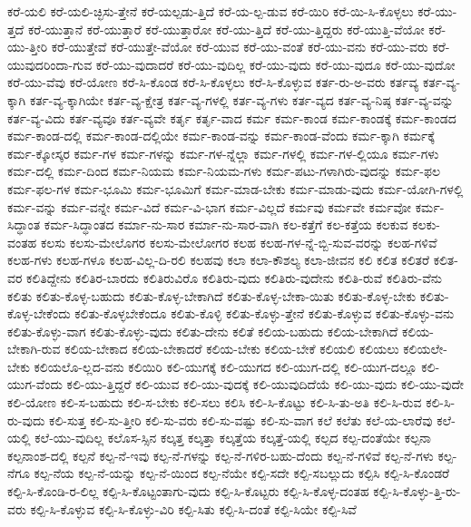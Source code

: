 {ಕರೆ-ಯಲಿ
ಕರೆ-ಯಲಿ-ಚ್ಛಿಸು-ತ್ತೇನೆ
ಕರೆ-ಯಲ್ಪಡು-ತ್ತಿದೆ
ಕರೆ-ಯ-ಲ್ಪ-ಡುವ
ಕರೆ-ಯಿರಿ
ಕರೆ-ಯಿ-ಸಿ-ಕೊಳ್ಳಲು
ಕರೆ-ಯು-ತ್ತದೆ
ಕರೆ-ಯುತ್ತಾನೆ
ಕರೆ-ಯುತ್ತಾರೆ
ಕರೆ-ಯುತ್ತಾರೋ
ಕರೆ-ಯು-ತ್ತಿದೆ
ಕರೆ-ಯು-ತ್ತಿದ್ದರು
ಕರೆ-ಯುತ್ತಿ-ವೆಯೋ
ಕರೆ-ಯು-ತ್ತೀರಿ
ಕರೆ-ಯುತ್ತೇವೆ
ಕರೆ-ಯುತ್ತೇ-ವೆಯೋ
ಕರೆ-ಯುವ
ಕರೆ-ಯು-ವಂತೆ
ಕರೆ-ಯು-ವನು
ಕರೆ-ಯು-ವರು
ಕರೆ-ಯುವುದರಿಂದಾ-ಗುವ
ಕರೆ-ಯು-ವುದಾದರೆ
ಕರೆ-ಯು-ವುದಿಲ್ಲ
ಕರೆ-ಯು-ವುದು
ಕರೆ-ಯು-ವುದೂ
ಕರೆ-ಯು-ವುದೋ
ಕರೆ-ಯು-ವೆವು
ಕರೆ-ಯೋಣ
ಕರೆ-ಸಿ-ಕೊಂಡ
ಕರೆ-ಸಿ-ಕೊಳ್ಳಲು
ಕರೆ-ಸಿ-ಕೊಳ್ಳುವ
ಕರ್ತ-ರು-ಅ-ವರು
ಕರ್ತವ್ಯ
ಕರ್ತ-ವ್ಯ-ಕ್ಕಾಗಿ
ಕರ್ತ-ವ್ಯ-ಕ್ಕಾಗಿಯೇ
ಕರ್ತ-ವ್ಯ-ಕ್ಷೇತ್ರ
ಕರ್ತ-ವ್ಯ-ಗಳಲ್ಲಿ
ಕರ್ತ-ವ್ಯ-ಗಳು
ಕರ್ತ-ವ್ಯದ
ಕರ್ತ-ವ್ಯ-ನಿಷ್ಠ
ಕರ್ತ-ವ್ಯ-ವನ್ನು
ಕರ್ತ-ವ್ಯ-ವಿದು
ಕರ್ತ-ವ್ಯವೂ
ಕರ್ತ-ವ್ಯವೇ
ಕರ್ತೃ
ಕರ್ತೃ-ವಾದ
ಕರ್ಮ
ಕರ್ಮ-ಕಾಂಡ
ಕರ್ಮ-ಕಾಂಡಕ್ಕೆ
ಕರ್ಮ-ಕಾಂಡದ
ಕರ್ಮ-ಕಾಂಡ-ದಲ್ಲಿ
ಕರ್ಮ-ಕಾಂಡ-ದಲ್ಲಿಯೇ
ಕರ್ಮ-ಕಾಂಡ-ವನ್ನು
ಕರ್ಮ-ಕಾಂಡ-ವೆಂದು
ಕರ್ಮ-ಕ್ಕಾಗಿ
ಕರ್ಮಕ್ಕೆ
ಕರ್ಮ-ಕ್ಕೋಸ್ಕರ
ಕರ್ಮ-ಗಳ
ಕರ್ಮ-ಗಳನ್ನು
ಕರ್ಮ-ಗಳ-ನ್ನೆಲ್ಲಾ
ಕರ್ಮ-ಗಳಲ್ಲಿ
ಕರ್ಮ-ಗಳ-ಲ್ಲಿಯೂ
ಕರ್ಮ-ಗಳು
ಕರ್ಮ-ದಲ್ಲಿ
ಕರ್ಮ-ದಿಂದ
ಕರ್ಮ-ನಿಯಮ
ಕರ್ಮ-ನಿಯಮ-ಗಳು
ಕರ್ಮ-ಪಟು-ಗಳಾಗಿರು-ವುದನ್ನು
ಕರ್ಮ-ಫಲ
ಕರ್ಮ-ಫಲ-ಗಳ
ಕರ್ಮ-ಭೂಮಿ
ಕರ್ಮ-ಭೂಮಿಗೆ
ಕರ್ಮ-ಮಾಡ-ಬೇಕು
ಕರ್ಮ-ಮಾಡು-ವುದು
ಕರ್ಮ-ಯೋಗಿ-ಗಳಲ್ಲಿ
ಕರ್ಮ-ವನ್ನು
ಕರ್ಮ-ವನ್ನೇ
ಕರ್ಮ-ವಿದೆ
ಕರ್ಮ-ವಿ-ಭಾಗ
ಕರ್ಮ-ವಿಲ್ಲದೆ
ಕರ್ಮವು
ಕರ್ಮವೇ
ಕರ್ಮವೋ
ಕರ್ಮ-ಸಿದ್ಧಾಂತ
ಕರ್ಮ-ಸಿದ್ಧಾಂತದ
ಕರ್ಮಾ-ನು-ಸಾರ
ಕರ್ಮಾ-ನು-ಸಾರ-ವಾಗಿ
ಕಲ-ಕತ್ತೆಗೆ
ಕಲ-ಕತ್ತೆಯ
ಕಲಕುವ
ಕಲಕು-ವಂತಹ
ಕಲಸು
ಕಲಸು-ಮೇಲೊಗರ
ಕಲಸು-ಮೇಲೋಗರ
ಕಲಹ
ಕಲಹ-ಗಳ-ನ್ನೆ-ಬ್ಬಿ-ಸುವ-ವರನ್ನು
ಕಲಹ-ಗಳಿವೆ
ಕಲಹ-ಗಳು
ಕಲಹ-ಗಳೂ
ಕಲಹ-ವಿಲ್ಲ-ದಿ-ರಲಿ
ಕಲಹವು
ಕಲಾ
ಕಲಾ-ಕೌಶಲ್ಯ
ಕಲಾ-ಜೀವನ
ಕಲಿ
ಕಲಿತ
ಕಲಿತರೆ
ಕಲಿತ-ವರ
ಕಲಿತಿದ್ದೇನು
ಕಲಿತಿರ-ಬಾರದು
ಕಲಿತಿರುವಿರೊ
ಕಲಿತಿರು-ವುದು
ಕಲಿತಿರು-ವುದೇನು
ಕಲಿತಿ-ರುವೆ
ಕಲಿತಿರು-ವೆನು
ಕಲಿತು
ಕಲಿತು-ಕೊಳ್ಳ-ಬಹುದು
ಕಲಿತು-ಕೊಳ್ಳ-ಬೇಕಾಗಿದೆ
ಕಲಿತು-ಕೊಳ್ಳ-ಬೇಕಾ-ಯಿತು
ಕಲಿತು-ಕೊಳ್ಳ-ಬೇಕು
ಕಲಿತು-ಕೊಳ್ಳ-ಬೇಕೆಂದು
ಕಲಿತು-ಕೊಳ್ಳಬೇಕೆಂದೂ
ಕಲಿತು-ಕೊಳ್ಳಿ
ಕಲಿತು-ಕೊಳ್ಳು-ತ್ತೇನೆ
ಕಲಿತು-ಕೊಳ್ಳುವ
ಕಲಿತು-ಕೊಳ್ಳು-ವನು
ಕಲಿತು-ಕೊಳ್ಳು-ವಾಗ
ಕಲಿತು-ಕೊಳ್ಳು-ವುದು
ಕಲಿತು-ದೇನು
ಕಲಿತೆ
ಕಲಿಯ-ಬಹುದು
ಕಲಿಯ-ಬೇಕಾಗಿದೆ
ಕಲಿಯ-ಬೇಕಾಗಿ-ರುವ
ಕಲಿಯ-ಬೇಕಾದ
ಕಲಿಯ-ಬೇಕಾದರೆ
ಕಲಿಯ-ಬೇಕು
ಕಲಿಯ-ಬೇಕೆ
ಕಲಿಯಲಿ
ಕಲಿಯಲು
ಕಲಿಯಲೇ-ಬೇಕು
ಕಲಿಯಲೊ-ಲ್ಲದ-ವನು
ಕಲಿಯಿರಿ
ಕಲಿ-ಯುಗಕ್ಕೆ
ಕಲಿ-ಯುಗದ
ಕಲಿ-ಯುಗ-ದಲ್ಲಿ
ಕಲಿ-ಯುಗ-ದಲ್ಲೂ
ಕಲಿ-ಯುಗ-ವೆಂದು
ಕಲಿ-ಯು-ತ್ತಿದ್ದರೆ
ಕಲಿ-ಯುವ
ಕಲಿ-ಯು-ವುದಕ್ಕೆ
ಕಲಿ-ಯುವುದಿದೆಯೆ
ಕಲಿ-ಯು-ವುದು
ಕಲಿ-ಯು-ವುದೇ
ಕಲಿ-ಯೋಣ
ಕಲಿ-ಸ-ಬಹುದು
ಕಲಿ-ಸ-ಬೇಕು
ಕಲಿ-ಸಲು
ಕಲಿಸಿ
ಕಲಿ-ಸಿ-ಕೊಟ್ಟು
ಕಲಿ-ಸಿ-ತು-ಅತಿ
ಕಲಿ-ಸಿ-ರುವ
ಕಲಿ-ಸಿ-ರು-ವುದು
ಕಲಿ-ಸುತ್ತ
ಕಲಿ-ಸು-ತ್ತೀರಿ
ಕಲಿ-ಸು-ವರು
ಕಲಿ-ಸು-ವಷ್ಟು
ಕಲಿ-ಸು-ವಾಗ
ಕಲೆ
ಕಲೆತು
ಕಲೆ-ಯ-ಲಾರೆವು
ಕಲೆ-ಯಲ್ಲಿ
ಕಲೆ-ಯು-ವುದಿಲ್ಲ
ಕಲೊಸ-ಸ್ಸಿನ
ಕಲ್ಕತ್ತ
ಕಲ್ಕತ್ತಾ
ಕಲ್ಕತ್ತೆಯ
ಕಲ್ಕತ್ತೆ-ಯಲ್ಲಿ
ಕಲ್ಪದ
ಕಲ್ಪ-ದಂತೆಯೇ
ಕಲ್ಪನಾ
ಕಲ್ಪನಾಂಶ-ದಲ್ಲಿ
ಕಲ್ಪನೆ
ಕಲ್ಪ-ನೆ-ಇವು
ಕಲ್ಪ-ನೆ-ಗಳನ್ನು
ಕಲ್ಪ-ನೆ-ಗಳಿರ-ಬಹು-ದೆಂದು
ಕಲ್ಪ-ನೆ-ಗಳಿವೆ
ಕಲ್ಪ-ನೆ-ಗಳು
ಕಲ್ಪ-ನೆಗೂ
ಕಲ್ಪ-ನೆಯ
ಕಲ್ಪ-ನೆ-ಯನ್ನು
ಕಲ್ಪ-ನೆ-ಯಿಂದ
ಕಲ್ಪ-ನೆಯೇ
ಕಲ್ಪಿ-ಸದೇ
ಕಲ್ಪಿ-ಸಬಲ್ಲುದು
ಕಲ್ಪಿಸಿ
ಕಲ್ಪಿ-ಸಿ-ಕೊಂಡರೆ
ಕಲ್ಪಿ-ಸಿ-ಕೊಂಡಿ-ರ-ಲಿಲ್ಲ
ಕಲ್ಪಿ-ಸಿ-ಕೊಟ್ಟಂತಾಗು-ವುದು
ಕಲ್ಪಿ-ಸಿ-ಕೊಟ್ಟರು
ಕಲ್ಪಿ-ಸಿ-ಕೊಳ್ಳ-ದಂತಹ
ಕಲ್ಪಿ-ಸಿ-ಕೊಳ್ಳು-ತ್ತಿ-ರು-ವರು
ಕಲ್ಪಿ-ಸಿ-ಕೊಳ್ಳುವ
ಕಲ್ಪಿ-ಸಿ-ಕೊಳ್ಳು-ವಿರಿ
ಕಲ್ಪಿ-ಸಿತು
ಕಲ್ಪಿ-ಸಿ-ದಂತೆ
ಕಲ್ಪಿ-ಸಿಯೇ
ಕಲ್ಪಿ-ಸಿವೆ
}
